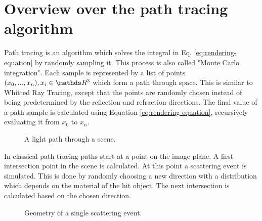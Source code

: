 \documentclass{ACGSeminar}
\begin{document}
\section{Overview over the path tracing algorithm} \label{path-tracing}
Path tracing is an algorithm which solves the integral in Eq. \eqref{eq:rendering-equation} by randomly sampling it. This process is also called "Monte Carlo integration". \cite{veach1997robust} Each sample is represented by a list of points $(x_0, ..., x_n), x_i \in \R^3$ which form a path through space. This is similar to Whitted Ray Tracing, except that the points are randomly chosen instead of being predetermined by the reflection and refraction directions. The final value of a path sample is calculated using Equation \eqref{eq:rendering-equation}, recursively evaluating it from $x_0$ to $x_n$. 

\begin{figure}[htb!]
  \centering
  
  \caption{A light path through a scene.}
  \label{fig:light-path}
\end{figure}

In classical path tracing paths start at a point on the image plane. A first intersection point in the scene is calculated. At this point a scattering event is simulated. This is done by randomly choosing a new direction with a distribution which depends on the material of the hit object. The next intersection is calculated based on the chosen direction.

\begin{figure}[htb!]
  \begin{centering}
    \par
  \end{centering}
  \caption{Geometry of a single scattering event.}
  \label{fig:scattering-event}
\end{figure}
\end{document}

